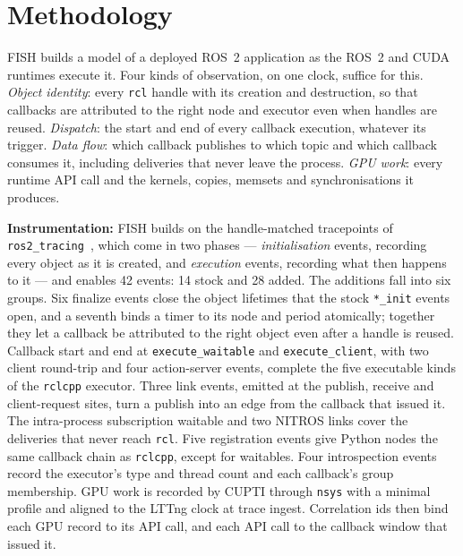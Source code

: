 
\section{Methodology}
\label{sec:method}

FISH builds a model of a deployed ROS~2 application as the ROS~2 and CUDA
runtimes execute it. Four kinds of observation, on one clock, suffice for this.
\emph{Object identity}: every \texttt{rcl} handle with its creation and
destruction, so that callbacks are attributed to the right node and executor
even when handles are reused. \emph{Dispatch}: the start and end of every
callback execution, whatever its trigger. \emph{Data flow}: which callback
publishes to which topic and which callback consumes it, including deliveries
that never leave the process. \emph{GPU work}: every runtime API call and the
kernels, copies, memsets and synchronisations it produces.

\noindent
\textbf{Instrumentation:}
FISH builds on the handle-matched tracepoints of
\texttt{ros2\_tracing}~\cite{bedard-2022-ros2tracing}, which come in two phases
--- \emph{initialisation} events, recording every object as it is created, and
\emph{execution} events, recording what then happens to it --- and enables 42
events: 14 stock and 28 added. The additions fall into six groups. Six finalize
events close the object lifetimes that the stock \texttt{*\_init} events open,
and a seventh binds a timer to its node and period atomically; together they let
a callback be attributed to the right object even after a handle is reused.
Callback start and end at \texttt{execute\_waitable} and
\texttt{execute\_client}, with two client round-trip and four action-server
events, complete the five executable kinds of the \texttt{rclcpp} executor.
Three link events, emitted at the publish, receive and client-request sites,
turn a publish into an edge from the callback that issued it. The intra-process
subscription waitable and two NITROS links cover the deliveries that never reach
\texttt{rcl}. Five registration events give Python nodes the same callback chain
as \texttt{rclcpp}, except for waitables. Four introspection events record the
executor's type and thread count and each callback's group membership. GPU work
is recorded by CUPTI through \texttt{nsys} with a minimal profile and aligned to
the LTTng clock at trace ingest. Correlation ids then bind each GPU record to
its API call, and each API call to the callback window that issued it.

